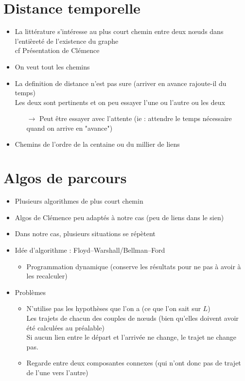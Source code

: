 \documentclass{article}
\begin{document}
\section*{Distance temporelle}
\begin{itemize}
	\item La littérature s'intéresse au plus court chemin entre deux nœuds dans l'entièreté de l'existence du graphe \\
	cf Présentation de Clémence
	\item On veut tout les chemins
	\item La definition de distance n'est pas sure (arriver en avance rajoute-il du temps) \\
	Les deux sont pertinents et on peu essayer l'une ou l'autre ou les deux
	\begin{itemize}
		\item[$\rightarrow$] Peut être essayer avec l'attente (ie : attendre le temps nécessaire quand on arrive en "avance")
	\end{itemize}
	\item Chemins de l'ordre de la centaine ou du millier de liens
\end{itemize}

\section*{Algos de parcours}
\begin{itemize}
	\item Plusieurs algorithmes de plus court chemin
	\item Algos de Clémence peu adaptés à notre cas (peu de liens dans le sien)
	\item Dans notre cas, plusieurs situations se répètent
	\item Idée d'algorithme : Floyd–Warshall/Bellman–Ford
	\begin{itemize}
		\item Programmation dynamique (conserve les résultats pour ne pas à avoir à les recalculer)
	\end{itemize}
	\item Problèmes
	\begin{itemize}
		\item N'utilise pas les hypothèses que l'on a (ce que l'on sait sur $L$) \\
		Les trajets de chacun des couples de nœuds (bien qu'elles doivent avoir été calculées au préalable) \\
		Si aucun lien entre le départ et l'arrivée ne change, le trajet ne change pas.
		\item Regarde entre deux composantes connexes (qui n'ont donc pas de trajet de l'une vers l'autre)
	\end{itemize}
\end{itemize}
\end{document}
